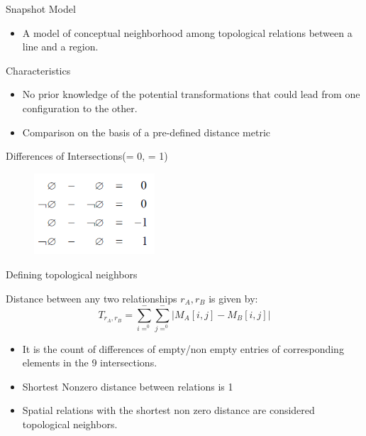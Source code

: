 

\begin{frame}{Snapshot Model}
\begin{itemize}
\item A model of conceptual neighborhood among topological relations between a line and a region.
\end{itemize}

		\begin{block}{Characteristics}
	\begin{itemize}
	
	\item No prior knowledge of the potential transformations that could lead from one configuration to the other. 
	\item Comparison on the basis of a pre-defined distance metric  
	\end{itemize}
	
		\end{block}
		
		\begin{block}{Differences of Intersections(\Empty = 0, \NotEmpty = 1)}
		\begin{figure}
		\begin{center}
			\includegraphics[width = 0.4\textwidth]{images/snapshotdiff.png}
		\end{center}
		\end{figure}
		\end{block}
	\end{frame}
	
\begin{frame}{Defining topological neighbors}
\begin{block}{}
Distance between any two relationships $r_A,r_B$ is given by: 
\begin{equation}
T_{r_A,r_B} = \sum\limits_{i=^0}^- \sum\limits_{j=^0}^-\left |M_A[i,j] - M_B[i,j]\right|
\end{equation}
\end{block}
\begin{block}{}
\begin{itemize}
\item It is the count of differences of empty/non empty entries of corresponding elements in the 9 intersections.
\item Shortest Nonzero distance between relations is 1
\item Spatial relations with the shortest non zero distance are considered topological neighbors. 
\end{itemize}
\end{block}
\end{frame}

